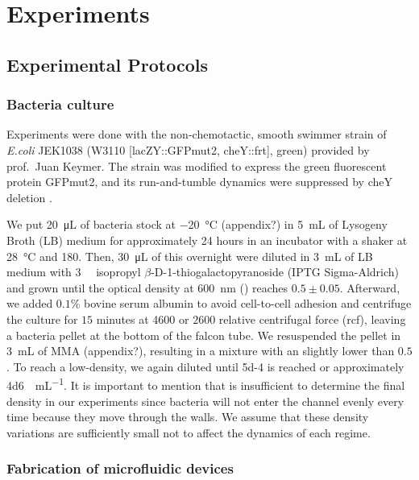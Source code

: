 \chapter{Experiments}

\section{Experimental Protocols}
\subsection{Bacteria culture}

Experiments were done with the non-chemotactic, smooth swimmer strain of \textit{E.coli} JEK1038 (W3110 [lacZY::GFPmut2, cheY::frt], green) provided by prof.\ Juan Keymer. The strain was modified to express the green fluorescent protein GFPmut2, and its run-and-tumble dynamics were suppressed by cheY deletion \cite{VanVliet2014ThePopulations}. 

We put \SI{20}{\micro\liter} of bacteria stock at \SI{-20}{\degreeCelsius} (appendix?) in \SI{5}{\milli\liter} of Lysogeny Broth (LB) medium for approximately 24 hours in an incubator with a shaker at \SI{28}{\degreeCelsius} and \SI{180}{\rpm}. Then, \SI{30}{\micro\liter} of this overnight were diluted in \SI{3}{\milli\liter} of LB medium with \SI{3}{\milli\molar} isopropyl $\beta$-D-1-thiogalactopyranoside (IPTG Sigma-Aldrich) and grown until the optical density at \SI{600}{\nano\meter} (\SI{}{\OD}) reaches $0.5\pm0.05$. Afterward, we added $0.1\%$ bovine serum albumin to avoid cell-to-cell adhesion and centrifuge the culture for $15$ minutes at \SI{4600}{\rpm} or $2600$ relative centrifugal force (rcf), leaving a bacteria pellet at the bottom of the falcon tube. We resuspended the pellet in \SI{3}{\milli\liter} of MMA (appendix?), resulting in a mixture with an \SI{}{\OD} slightly lower than $0.5$. To reach a low-density, we again diluted until \SI{5d-4}{\OD} is reached or approximately \SI[per-mode = symbol]{4d6}{\cells\per\milli\liter}. It is important to mention that \SI{}{\OD} is insufficient to determine the final density in our experiments since bacteria will not enter the channel evenly every time because they move through the walls. We assume that these density variations are sufficiently small not to affect the dynamics of each regime.

\subsection{Fabrication of microfluidic devices}


